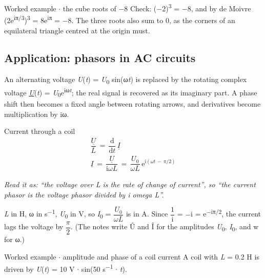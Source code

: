 \documentclass[11pt]{article}
\begin{document}
\begin{keepsection}
\begin{keepsection}
\begin{workedbox}{Worked example \ensuremath{\cdot} the cube roots of \ensuremath{-}8}
Check: (\ensuremath{-}2)\textsuperscript{3} = \ensuremath{-}8, and by de Moivre (2e\textsuperscript{iπ/3})\textsuperscript{3} = 8e\textsuperscript{iπ} = \ensuremath{-}8. The three roots also sum to 0, as the corners of an equilateral triangle centred at the origin must.
\end{workedbox}
\end{keepsection}

\begin{keepsection}
\subsection{Application: phasors in AC circuits}

An alternating voltage \textit{U}(\textit{t}) = \textit{U}\textsubscript{0} sin(ω\textit{t}) is replaced by the rotating complex voltage \underline{\textit{U}}(\textit{t}) = \textit{U}\textsubscript{0}e\textsuperscript{iω\textit{t}}; the real signal is recovered as its imaginary part. A phase shift then becomes a fixed angle between rotating arrows, and derivatives become multiplication by iω.

\begin{equationcard}{Current through a coil}
\[ \begin{gathered} \dfrac{\underline{{U}}}{{L}}\, =\, \dfrac{\mathrm{d}}{\mathrm{d}{t}}\, \underline{{I}} \\ \underline{{I}}\, =\, \dfrac{\underline{{U}}}{\mathrm{i}ω{L}}\, =\, \dfrac{{U}_{0}}{ω{L}}\, \mathrm{e}^{\mathrm{i}(ω{t}\, -\, π/2)} \end{gathered} \]
{\small \emph{Read it as: “the voltage over L is the rate of change of current”, so “the current phasor is the voltage phasor divided by i omega L”.}\par \textit{L} in H, ω in s\textsuperscript{\ensuremath{-}1}, \textit{U}\textsubscript{0} in V, so \textit{I}\textsubscript{0} = {\small\ensuremath{\dfrac{{U}_{0}}{ω{L}}}} is in A. Since {\small\ensuremath{\dfrac{1}{\mathrm{i}}}} = \ensuremath{-}i = e\textsuperscript{\ensuremath{-}iπ/2}, the current lags the voltage by {\small\ensuremath{\dfrac{π}{2}}}. (The notes write Û and Î for the amplitudes \textit{U}\textsubscript{0}, \textit{I}\textsubscript{0}, and w for ω.)}
\end{equationcard}

\begin{workedbox}{Worked example \ensuremath{\cdot} amplitude and phase of a coil current}
A coil with \textit{L} = 0.2 H is driven by \textit{U}(\textit{t}) = 10 V \ensuremath{\cdot} sin(50 s\textsuperscript{\ensuremath{-}1} \ensuremath{\cdot} \textit{t}).


\end{workedbox}
\end{keepsection}
\end{keepsection}
\end{document}
